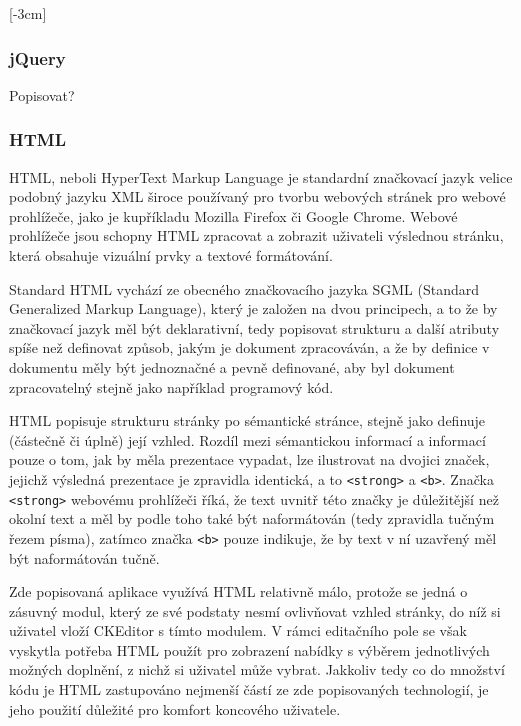 \documentclass{article}
\begin{document}
[-3cm]

\subsubsection{jQuery}

Popisovat?

\subsubsection{HTML}

HTML, neboli HyperText Markup Language je standardní značkovací jazyk velice podobný jazyku XML široce používaný pro tvorbu webových stránek pro webové prohlížeče, jako je kupříkladu Mozilla Firefox či Google Chrome. Webové prohlížeče jsou schopny HTML zpracovat a zobrazit uživateli výslednou stránku, která obsahuje vizuální prvky a textové formátování. 

Standard HTML vychází ze obecného značkovacího jazyka SGML (Standard Generalized Markup Language), který je založen na dvou principech, a to že by značkovací jazyk měl být deklarativní, tedy popisovat strukturu a další atributy spíše než definovat způsob, jakým je dokument zpracováván, a že by definice v dokumentu měly být jednoznačné a pevně definované, aby byl dokument zpracovatelný stejně jako například programový kód. %


HTML popisuje strukturu stránky po sémantické stránce, stejně jako definuje (částečně či úplně) její vzhled. Rozdíl mezi sémantickou informací a informací pouze o tom, jak by měla prezentace vypadat, lze ilustrovat na dvojici značek, jejichž výsledná prezentace je zpravidla identická, a to {\tt <strong>} a {\tt <b>}. Značka {\tt <strong>} webovému prohlížeči říká, že text uvnitř této značky je důležitější než okolní text a měl by podle toho také být naformátován (tedy zpravidla tučným řezem písma), zatímco značka {\tt <b>} pouze indikuje, že by text v ní uzavřený měl být naformátován tučně. %


Zde popisovaná aplikace využívá HTML relativně málo, protože se jedná o zásuvný modul, který ze své podstaty nesmí ovlivňovat vzhled stránky, do níž si uživatel vloží CKEditor s tímto modulem. V rámci editačního pole se však vyskytla potřeba HTML použít pro zobrazení nabídky s výběrem jednotlivých možných doplnění, z nichž si uživatel může vybrat. Jakkoliv tedy co do množství kódu je HTML zastupováno nejmenší částí ze zde popisovaných technologií, je jeho použití důležité pro komfort koncového uživatele.
\end{document}
